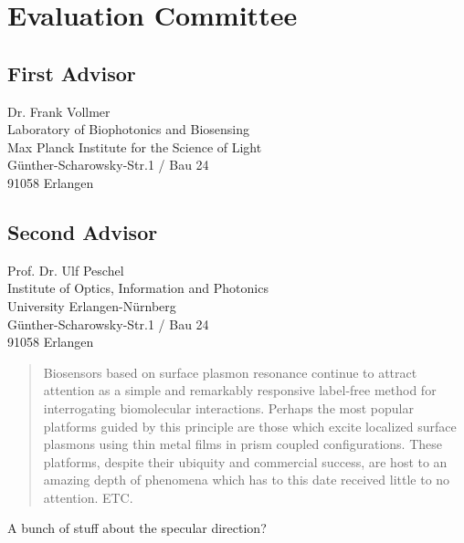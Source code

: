 \documentclass[a4paper]{report}
\begin{document}
\section*{Evaluation Committee}
\subsection*{First Advisor}
Dr. Frank Vollmer\\
Laboratory of Biophotonics and Biosensing\\
Max Planck Institute for the Science of Light\\
G\"unther-Scharowsky-Str.1 / Bau 24\\
91058 Erlangen
\subsection*{Second Advisor}
Prof. Dr. Ulf Peschel\\
Institute of Optics, Information and Photonics\\
University Erlangen-N\"urnberg\\
G\"unther-Scharowsky-Str.1 / Bau 24\\
91058 Erlangen

\tableofcontents

\begin{abstract}
Biosensors based on surface plasmon resonance continue to attract
attention as a simple and remarkably responsive label-free method for
interrogating biomolecular interactions.  Perhaps the most popular
platforms guided by this principle are those which excite localized surface
plasmons using thin metal films in prism coupled configurations.  These
platforms, despite their ubiquity and commercial success, are host to an
amazing depth of phenomena which has to this date received little to no
attention. ETC.
\end{abstract}

A bunch of stuff about the specular direction?
\end{document}
